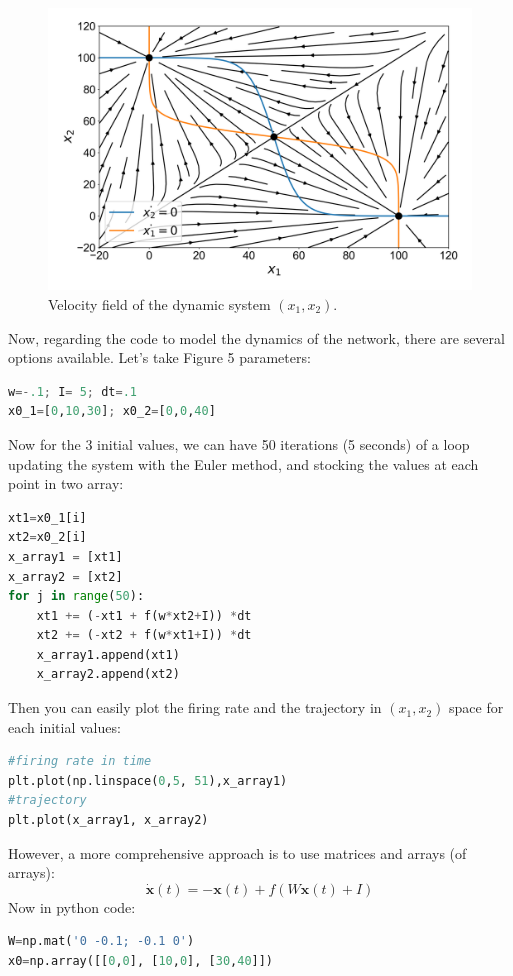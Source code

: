 \documentclass{article}
\begin{document}
\begin{figure}[H]
\centering
\includegraphics[width=1\linewidth]{exercice5fig8.png}
\caption[spt]{Velocity field of the dynamic system $(x_1, x_2)$.}\label{fig:fig7}
\end{figure}

Now, regarding the code to model the dynamics of the network, there are several options available. Let's take Figure 5 parameters:

\begin{lstlisting}[language=Python, caption=Parameters]
w=-.1; I= 5; dt=.1
x0_1=[0,10,30]; x0_2=[0,0,40]
\end{lstlisting}
\indent Now for the 3 initial values, we can have 50 iterations (5 seconds) of a loop updating the system with the Euler method, and stocking the values at each point in two array:
\begin{lstlisting}[language=Python, caption=System dynamics]
xt1=x0_1[i]
xt2=x0_2[i]
x_array1 = [xt1]
x_array2 = [xt2]
for j in range(50):
    xt1 += (-xt1 + f(w*xt2+I)) *dt
    xt2 += (-xt2 + f(w*xt1+I)) *dt
    x_array1.append(xt1)
    x_array2.append(xt2)
\end{lstlisting}

Then you can easily plot the firing rate and the trajectory in $(x_1, x_2)$ space for each initial values:
\begin{lstlisting}[language=Python, caption=Plots]
#firing rate in time
plt.plot(np.linspace(0,5, 51),x_array1)
#trajectory
plt.plot(x_array1, x_array2)
\end{lstlisting}

However, a more comprehensive approach is to use matrices and arrays (of arrays):
\begin{equation}\label{eq:6}
    \dot{\mathbf{x}}(t) = -\mathbf{x}(t) + f(W \mathbf{x}(t) + I)
\end{equation}
Now in python code:
\begin {lstlisting}[language=Python, caption=Parameters]
W=np.mat('0 -0.1; -0.1 0')
x0=np.array([[0,0], [10,0], [30,40]])
\end{lstlisting}
\end{document}
